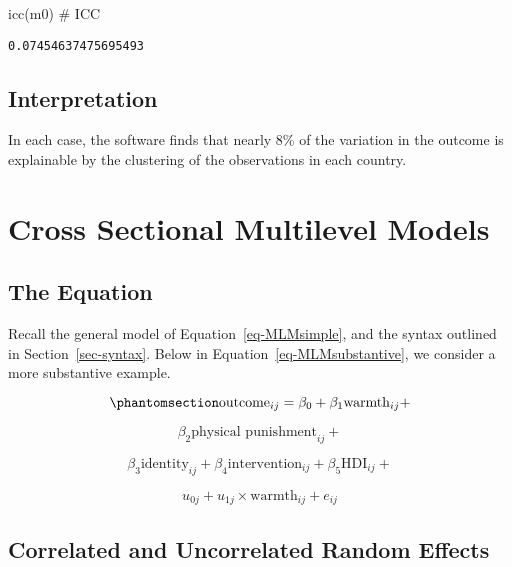 \documentclass[
  letterpaper,
  DIV=11,
  numbers=noendperiod]{scrreprt}
\newenvironment{Shaded}{\begin{snugshade}}{\end{snugshade}}
\newcommand{\CommentTok}[1]{\textcolor[rgb]{0.37,0.37,0.37}{#1}}
\newcommand{\FunctionTok}[1]{\textcolor[rgb]{0.28,0.35,0.67}{#1}}
\newcommand{\NormalTok}[1]{\textcolor[rgb]{0.00,0.23,0.31}{#1}}
\begin{document}
\begin{Shaded}
\begin{Highlighting}[]

\FunctionTok{icc}\NormalTok{(m0) }\CommentTok{\# ICC}
\end{Highlighting}
\end{Shaded}

\begin{verbatim}
0.07454637475695493
\end{verbatim}

\section{Interpretation}\label{interpretation-1}

In each case, the software finds that nearly 8\% of the variation in the
outcome is explainable by the clustering of the observations in each
country.


\chapter{Cross Sectional Multilevel
Models}\label{cross-sectional-multilevel-models}

\section{The Equation}\label{the-equation-1}

Recall the general model of Equation~\ref{eq-MLMsimple}, and the syntax
outlined in Section~\ref{sec-syntax}. Below in
Equation~\ref{eq-MLMsubstantive}, we consider a more substantive
example.

\begin{equation}\phantomsection\label{eq-MLMsubstantive}{\text{outcome}_{ij}= \beta_0 + \beta_1 \text{warmth}_{ij} +}\end{equation}

\[\beta_2 \text{physical punishment}_{ij} +\]

\[\beta_3 \text{identity}_{ij} + \beta_4 \text{intervention}_{ij} + \beta_5 \text{HDI}_{ij} +\]

\[u_{0j} + u_{1j} \times \text{warmth}_{ij} + e_{ij}\]

\section{Correlated and Uncorrelated Random
Effects}\label{correlated-and-uncorrelated-random-effects}
\end{document}
